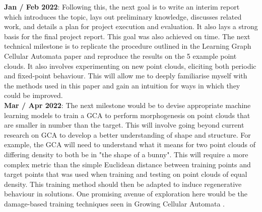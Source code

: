 \textbf{Jan / Feb 2022}: Following this, the next goal is to write an interim report which introduces the topic, lays out preliminary knowledge, discusses related work, and details a plan for project execution and evaluation.
It also lays a strong basis for the final project report.
This goal was also achieved on time.
The next technical milestone is to replicate the procedure outlined in the Learning Graph Cellular Automata paper \cite{grattarola2021learning} and reproduce the results on the 5 example point clouds.
It also involves experimenting on new point clouds, eliciting both periodic and fixed-point behaviour.
This will allow me to deeply familiarise myself with the methods used in this paper and gain an intuition for ways in which they could be improved.\\

\textbf{Mar / Apr 2022}: The next milestone would be to devise appropriate machine learning models to train a GCA to perform morphogenesis on point clouds that are smaller in number than the target. 
This will involve going beyond current research on GCA to develop a better understanding of shape and structure. 
For example, the GCA will need to understand what it means for two point clouds of differing density to both be in "the shape of a bunny". 
This will require a more complex metric than the simple Euclidean distance between training points and target points that was used when training and testing on point clouds of equal density.
This training method should then be adapted to induce regenerative behaviour in solutions.
One promising avenue of exploration here would be the damage-based training techniques seen in Growing Cellular Automata \cite{mordvintsev2020growing}.\\

